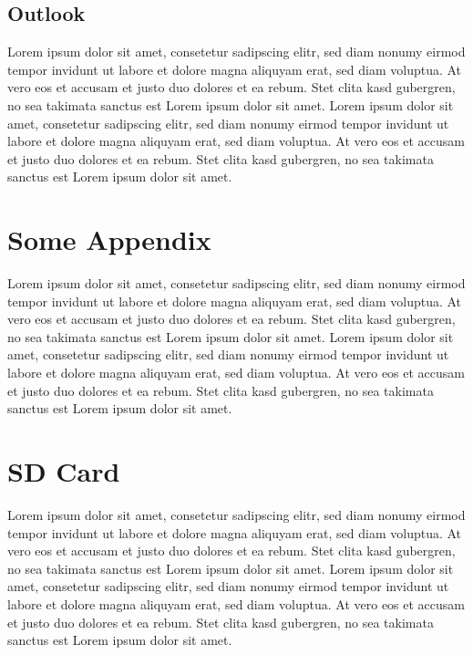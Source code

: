 \documentclass[11pt,oneside,a4paper]{book}
\makeatletter
\newcommand{\demotechaptersintoc}{%
  \addtocontents{toc}{\let\protect\l@chapter\protect\l@section}%
}
\makeatother
\begin{document}
\section{Outlook}
Lorem ipsum dolor sit amet, consetetur sadipscing elitr, sed diam nonumy eirmod tempor invidunt ut labore et dolore magna aliquyam erat, sed diam voluptua. At vero eos et accusam et justo duo dolores et ea rebum. Stet clita kasd gubergren, no sea takimata sanctus est Lorem ipsum dolor sit amet. Lorem ipsum dolor sit amet, consetetur sadipscing elitr, sed diam nonumy eirmod tempor invidunt ut labore et dolore magna aliquyam erat, sed diam voluptua. At vero eos et accusam et justo duo dolores et ea rebum. Stet clita kasd gubergren, no sea takimata sanctus est Lorem ipsum dolor sit amet.

\appendix
\addappheadtotoc
\demotechaptersintoc
\chapter{Some Appendix}
Lorem ipsum dolor sit amet, consetetur sadipscing elitr, sed diam nonumy eirmod tempor invidunt ut labore et dolore magna aliquyam erat, sed diam voluptua. At vero eos et accusam et justo duo dolores et ea rebum. Stet clita kasd gubergren, no sea takimata sanctus est Lorem ipsum dolor sit amet. Lorem ipsum dolor sit amet, consetetur sadipscing elitr, sed diam nonumy eirmod tempor invidunt ut labore et dolore magna aliquyam erat, sed diam voluptua. At vero eos et accusam et justo duo dolores et ea rebum. Stet clita kasd gubergren, no sea takimata sanctus est Lorem ipsum dolor sit amet.
\chapter{SD Card}
Lorem ipsum dolor sit amet, consetetur sadipscing elitr, sed diam nonumy eirmod tempor invidunt ut labore et dolore magna aliquyam erat, sed diam voluptua. At vero eos et accusam et justo duo dolores et ea rebum. Stet clita kasd gubergren, no sea takimata sanctus est Lorem ipsum dolor sit amet. Lorem ipsum dolor sit amet, consetetur sadipscing elitr, sed diam nonumy eirmod tempor invidunt ut labore et dolore magna aliquyam erat, sed diam voluptua. At vero eos et accusam et justo duo dolores et ea rebum. Stet clita kasd gubergren, no sea takimata sanctus est Lorem ipsum dolor sit amet.

\printbibliography[title={References}, nottype=online]
\printbibliography[title={Online References}, type=online]
\end{document}
